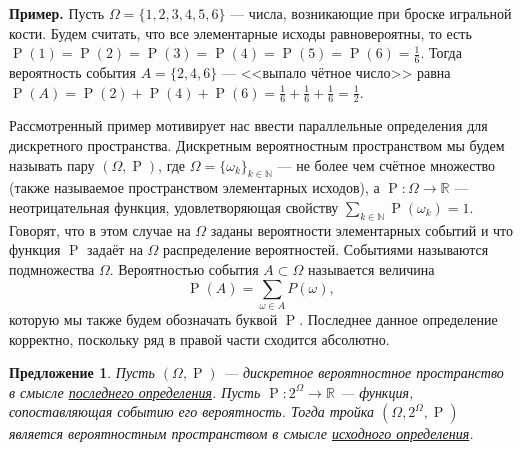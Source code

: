 \documentclass[12pt]{article}
\newtheorem{proposition}[theorem]{Предложение}
\numberwithin{theorem}{section}
\theoremstyle{definition}
\newenvironment{example}{\indent \textbf{Пример.}}{\indent}
\newcommand{\RR}{\mathbb{R}}
\newcommand{\prob}{\operatorname{P}}
\newcommand{\defin}[2]{\hypertarget{#2}{{\color{red} #1}}}
\begin{document}
	\begin{example}
		Пусть $ \Omega = \{1,2,3,4,5,6\} $ --- числа, возникающие при броске игральной кости.
		Будем считать, что все элементарные исходы равновероятны, 
		то есть $ \prob(1) = \prob(2) = \prob(3) = \prob(4) = \prob(5) = \prob(6) = \tfrac{1}{6} $.
		Тогда вероятность события $ A = \{2,4,6\} $ --- <<выпало чётное число>> 
		равна $ \prob(A) = \prob(2) + \prob(4) + \prob(6) = \tfrac{1}{6} + \tfrac{1}{6} + \tfrac{1}{6} = \tfrac{1}{2} $.
	\end{example}
	
	Рассмотренный пример мотивирует нас ввести параллельные определения для дискретного пространства.
	\defin{Дискретным вероятностным пространством}{discr-2} мы будем называть  пару $ (\Omega, \prob) $, 
	где $ \Omega = \{\omega_k\}_{k \in \mathbb{N}} $ --- не более чем счётное множество 
	(также называемое \defin{пространством элементарных исходов}{space-discr}),
	а $ \prob \colon \Omega \to \RR $ --- неотрицательная функция, удовлетворяющая свойству
	$ \sum\limits_{k \in \mathbb{N}} \prob(\omega_k) = 1 $.	
	Говорят, что в этом случае на $ \Omega $ \defin{заданы вероятности элементарных событий}{prob-defined} и что функция $ \prob $ 
	\defin{задаёт на $ \Omega $ распределение вероятностей}{disrtib-discr}.
	\defin{Событиями}{event-discr} называются подмножества $ \Omega $. 
	\defin{Вероятностью события}{prob-discr} $ A \subset \Omega $ называется величина
	$$ \prob(A) = \sum\limits_{\omega \in A} P(\omega), $$
	которую мы также будем обозначать буквой $ \prob $. 
	Последнее данное определение корректно, поскольку ряд в правой части сходится абсолютно.
	
	\begin{proposition} \label{}
		Пусть $ (\Omega, \prob) $ --- дискретное вероятностное пространство в смысле \hyperlink{discr-2}{последнего определения}.
		Пусть $ \prob \colon 2^{\Omega} \to \mathbb{R} $ --- функция, сопоставляющая событию его вероятность.
		Тогда тройка $ (\Omega, 2^{\Omega}, \prob) $ является вероятностным пространством в смысле \hyperlink{prob-space}{исходного определения}.
	\end{proposition}
	
\end{document}
